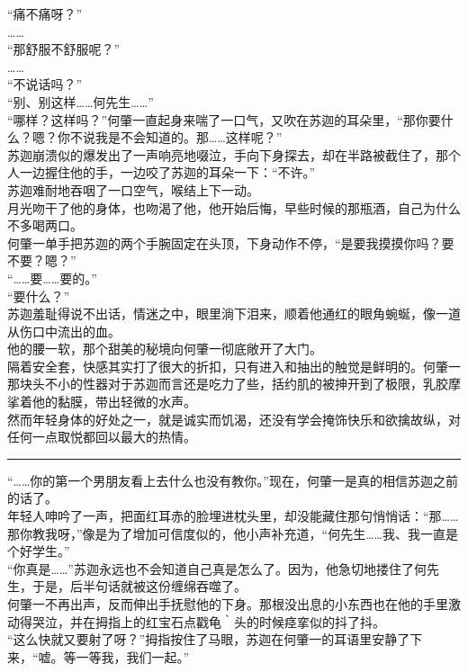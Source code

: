 \documentclass[oneside,11pt]{memoir} %
\begin{document}
\begin{CJK}{UTF8}{gbsn}
    “痛不痛呀？”\\\indent
    ……\\\indent
    “那舒服不舒服呢？”\\\indent
    ……\\\indent
    “不说话吗？”\\\indent
    “别、别这样……何先生……”\\\indent
    “哪样？这样吗？”何肇一直起身来喘了一口气，又吹在苏迦的耳朵里，“那你要什么？嗯？你不说我是不会知道的。那……这样呢？”\\\indent
    苏迦崩溃似的爆发出了一声响亮地啜泣，手向下身探去，却在半路被截住了，那个人一边握住他的手，一边咬了苏迦的耳朵一下：“不许。”\\\indent
    苏迦难耐地吞咽了一口空气，喉结上下一动。\\\indent
    月光吻干了他的身体，也吻渴了他，他开始后悔，早些时候的那瓶酒，自己为什么不多喝两口。\\\indent
    何肇一单手把苏迦的两个手腕固定在头顶，下身动作不停，“是要我摸摸你吗？要不要？嗯？”\\\indent
    “……要……要的。”\\\indent
    “要什么？”\\\indent
    苏迦羞耻得说不出话，情迷之中，眼里淌下泪来，顺着他通红的眼角蜿蜒，像一道从伤口中流出的血。\\\indent
    他的腰一软，那个甜美的秘境向何肇一彻底敞开了大门。\\\indent
    隔着安全套，快感其实打了很大的折扣，只有进入和抽出的触觉是鲜明的。何肇一那块头不小的性器对于苏迦而言还是吃力了些，括约肌的被抻开到了极限，乳胶摩挲着他的黏膜，带出轻微的水声。\\\indent
    然而年轻身体的好处之一，就是诚实而饥渴，还没有学会掩饰快乐和欲擒故纵，对任何一点取悦都回以最大的热情。\\\indent
\rule{-3pt}{30pt}
    “……你的第一个男朋友看上去什么也没有教你。”现在，何肇一是真的相信苏迦之前的话了。\\\indent
    年轻人呻吟了一声，把面红耳赤的脸埋进枕头里，却没能藏住那句悄悄话：“那……那你教我呀，”像是为了增加可信度似的，他小声补充道，“何先生……我、我一直是个好学生。”\\\indent
    “你真是……”苏迦永远也不会知道自己真是怎么了。因为，他急切地搂住了何先生，于是，后半句话就被这份缠绵吞噬了。\\\indent
    何肇一不再出声，反而伸出手抚慰他的下身。那根没出息的小东西也在他的手里激动得哭泣，并在拇指上的红宝石点戳龟｀头的时候痉挛似的抖了抖。\\\indent
    “这么快就又要射了呀？”拇指按住了马眼，苏迦在何肇一的耳语里安静了下来，“嘘。等一等我，我们一起。”\\\indent

\end{CJK}
\end{document}
